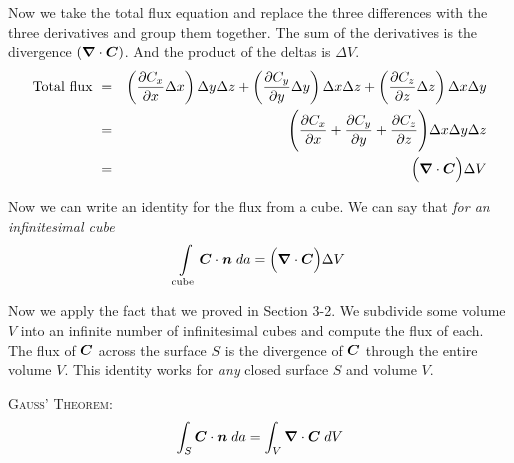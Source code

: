 Now we take the total flux equation and 
replace the three differences with the three derivatives and group them together.
The sum of the derivatives is the divergence $(\boldsymbol{\nabla} \cdot \boldsymbol{C})$.
And the product of the deltas is $\Delta V$.
\begin{eqnarray*}
  \mathrm{Total\ flux\ } &=&
  \left( \frac{\partial C_x}{\partial x} \Delta x \right) \Delta y \Delta z +
  \left( \frac{\partial C_y}{\partial y} \Delta y \right) \Delta x \Delta z +
  \left( \frac{\partial C_z}{\partial z} \Delta z \right) \Delta x \Delta y \\
  &=& \Bigg( \frac{\partial C_x}{\partial x} + \frac{\partial C_y}{\partial y} + \frac{\partial C_z}{\partial z} \Bigg)
  \Delta x \Delta y \Delta z \\
  &=& \Big( \boldsymbol{\nabla} \cdot \boldsymbol{C} \Big) \Delta V
\end{eqnarray*}

Now we can write an identity for the flux from a cube.
We can say that \emph{for an infinitesimal cube}
\begin{equation}
  \int\limits_{\mathrm{cube}}
  \boldsymbol{C} \cdot \boldsymbol{n} \; da = \Big( \boldsymbol{\nabla} \cdot \boldsymbol{C} \Big) \Delta V
\end{equation}

Now we apply the fact that we proved in Section 3-2.
We subdivide some volume $V$ into an infinite number of infinitesimal cubes
and compute the flux of each.
The flux of $\boldsymbol{C}$ across the surface $S$
is the divergence of $\boldsymbol{C}$ through the entire volume $V$.
This identity works for \emph{any} closed surface $S$ and volume $V$.

\hspace{2em} \textsc{Gauss' Theorem:}
\begin{equation}
  \int_S \boldsymbol{C} \cdot \boldsymbol{n} \; da = \int_V \boldsymbol{\nabla} \cdot \boldsymbol{C} \; dV
\end{equation}

